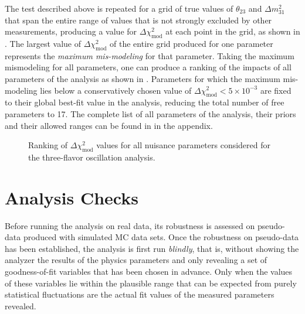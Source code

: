 The test described above is repeated for a grid of true values of $\theta_{23}$ and $\Delta m^2_{31}$ that span the entire range of values that is not strongly excluded by other measurements, producing a value for $\Delta \chi^2_{\mathrm{mod}}$ at each point in the grid, as shown in . The largest value of $\Delta \chi^2_{\mathrm{mod}}$ of the entire grid produced for one parameter represents the \emph{maximum mis-modeling} for that parameter. Taking the maximum mismodeling for all parameters, one can produce a ranking of the impacts of all parameters of the analysis as shown in . Parameters for which the maximum mis-modeling lies below a conservatively chosen value of $\Delta \chi^2_{\mathrm{mod}} < 5\times10^{-3}$ are fixed to their global best-fit value in the analysis, reducing the total number of free parameters to 17. The complete list of all parameters of the analysis, their priors and their allowed ranges can be found in  in the appendix.
\begin{figure}
    \centering
    
    \caption{Ranking of $\Delta \chi^2_{\mathrm{mod}}$ values for all nuisance parameters considered for the three-flavor oscillation analysis.}
    \label{fig:systematic-impact-mismod-ranking}
\end{figure}

\section{Analysis Checks}
Before running the analysis on real data, its robustness is assessed on pseudo-data produced with simulated MC data sets. Once the robustness on pseudo-data has been established, the analysis is first run \emph{blindly}, that is, without showing the analyzer the results of the physics parameters and only revealing a set of goodness-of-fit variables that has been chosen in advance. Only when the values of these variables lie within the plausible range that can be expected from purely statistical fluctuations are the actual fit values of the measured parameters revealed. 

